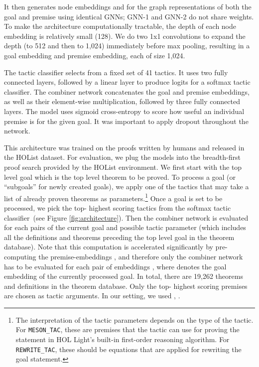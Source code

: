 \documentclass[letterpaper]{article} \usepackage{aaai20}  \usepackage{times}  \usepackage{helvet} \usepackage{courier}  \usepackage[hyphens]{url}  \usepackage{graphicx} \urlstyle{rm} \def\UrlFont{\rm}  \usepackage{graphicx}  \frenchspacing  \setlength{\pdfpagewidth}{8.5in}  \setlength{\pdfpageheight}{11in}
\begin{document}
It then generates node embeddings  and  for the graph representations of both the goal  and premise  using identical GNNs; GNN-1 and GNN-2 do not share weights.
To make the architecture computationally tractable, the depth of each node embedding is relatively small (128). 
We do two 1x1 convolutions to expand the depth (to 512 and then to 1,024) immediately before max pooling, resulting in a goal embedding and premise embedding, each of size 1,024. 

The tactic classifier selects from a fixed set of 41 tactics.
It uses two fully connected layers, followed by a linear layer to produce logits for a softmax tactic classifier.
The combiner network concatenates the goal and premise embeddings, as well as their element-wise multiplication, followed by three fully connected layers.
The model uses sigmoid cross-entropy to score how useful an individual premise is for the given goal. It was important to apply dropout throughout the network.

This architecture was trained on the proofs written by humans and released in the HOList dataset.
For evaluation, we plug the models into the breadth-first proof search provided by the HOList environment. We first start with the top level goal which is the top level theorem to be proved. To process a goal (or ``subgoals'' for newly created goals), we apply one of the tactics that may take a list of already proven theorems as parameters.\footnote{The interpretation of the tactic parameters depends on the type of the tactic. For {\tt MESON\_TAC}, these are premises that the tactic can use for proving the statement in HOL Light's built-in first-order reasoning algorithm. For {\tt REWRITE\_TAC}, these should be equations that are applied for rewriting the goal statement.}
Once a goal is set to be processed, we pick the top- highest scoring tactics from the softmax tactic classifier~(see Figure \ref{fig:architecture}). Then the combiner network is evaluated for each  pairs of the current goal  and possible tactic parameter  (which includes all the definitions and theorems preceding the top level goal in the theorem database). Note that this computation is accelerated significantly by pre-computing the premise-embeddings , and therefore only the combiner network has to be evaluated for each pair of embeddings , where  denotes the goal embedding of the currently processed goal. In total, there are 19,262 theorems and definitions in the theorem database.  Only the top- highest scoring premises are chosen as tactic arguments. In our setting, we used , .
\end{document}
